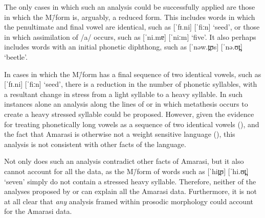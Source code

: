 The only cases in which such an analysis could be successfully
applied are those in which the M\=/form is, arguably, a reduced form.
This includes words in which the penultimate and final vowel
are identical, such as  [ˈfɪ.ni] {\ra}  [ˈfiːn] `seed',
or those in which assimilation of /a/ occurs, such as  [ˈni.mɐ] {\ra}  [ˈniːm] `five'.
It also perhaps includes words with an initial phonetic diphthong,
such as  [ˈnəw.t̪ʊs] {\ra}  [ˈnə.ʊt̪] `beetle'.

In cases in which the M\=/form
has a final sequence of two identical vowels,
such as  [ˈfɪ.ni] {\ra}  [ˈfiːn] `seed',
there is a reduction in the number of phonetic syllables,
with a resultant change in stress from a light syllable to a heavy syllable.
In such instances alone an analysis along the lines of \cite{mcc00} or \cite{he04}
in which metathesis occurs to create a heavy stressed syllable could be proposed.
However, given the evidence for treating phonetically long vowels
as a sequence of two identical vowels (),
and the fact that Amarasi is otherwise not a weight sensitive language (),
this analysis is not consistent with other facts of the language.

Not only does such an analysis contradict other
facts of Amarasi, but it also cannot account for all the data,
as the M\=/form of words such as  [ˈhit̪ʊ] {\ra}  [ˈhi.ʊt̪] `seven'
simply do not contain a stressed heavy syllable.
Therefore, neither of the analyses proposed by \citet{mcc00} or \citet{he04}
can explain all the Amarasi data.
Furthermore, it is not at all clear that \emph{any} analysis
framed within prosodic morphology could account for the Amarasi data.

